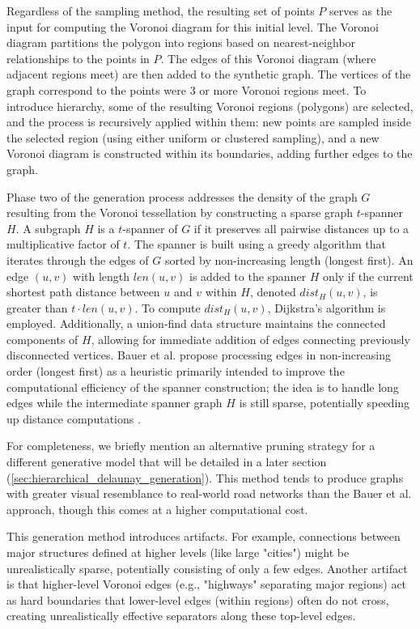 Regardless of the sampling method, the resulting set of points \(P\) serves as the input for computing the Voronoi diagram for this initial level.
The Voronoi diagram partitions the polygon into regions based on nearest-neighbor relationships to the points in \(P\).
The edges of this Voronoi diagram (where adjacent regions meet) are then added to the synthetic graph.
The vertices of the graph correspond to the points were 3 or more Voronoi regions meet.
To introduce hierarchy, some of the resulting Voronoi regions (polygons) are selected, and the process is recursively applied within them: new points are sampled inside the selected region (using either uniform or clustered sampling), and a new Voronoi diagram is constructed within its boundaries, adding further edges to the graph.

Phase two of the generation process addresses the density of the graph \(G\) resulting from the Voronoi tessellation by constructing a sparse graph \(t\)-spanner \(H\).
A subgraph \(H\) is a \(t\)-spanner of \(G\) if it preserves all pairwise distances up to a multiplicative factor of \(t\).
The spanner is built using a greedy algorithm that iterates through the edges of \(G\) sorted by non-increasing length (longest first).
An edge \((u, v)\) with length \(len(u, v)\) is added to the spanner \(H\) only if the current shortest path distance between \(u\) and \(v\) within \(H\), denoted \(dist_H(u, v)\), is greater than \(t \cdot len(u, v)\).
To compute \(dist_H(u, v)\), Dijkstra's algorithm is employed.
Additionally, a union-find data structure maintains the connected components of \(H\), allowing for immediate addition of edges connecting previously disconnected vertices.
Bauer et al. propose processing edges in non-increasing order (longest first) as a heuristic primarily intended to improve the computational efficiency of the spanner construction; the idea is to handle long edges while the intermediate spanner graph \(H\) is still sparse, potentially speeding up distance computations \cite{hutchison_synthetic_2010}.

For completeness, we briefly mention an alternative pruning strategy for a different generative model that will be detailed in a later section (\cref{sec:hierarchical_delaunay_generation}).
This method tends to produce graphs with greater visual resemblance to real-world road networks than the Bauer et al. approach, though this comes at a higher computational cost.

This generation method introduces artifacts.
For example, connections between major structures defined at higher levels (like large "cities") might be unrealistically sparse, potentially consisting of only a few edges.
Another artifact is that higher-level Voronoi edges (e.g., "highways" separating major regions) act as hard boundaries that lower-level edges (within regions) often do not cross, creating unrealistically effective separators along these top-level edges.

